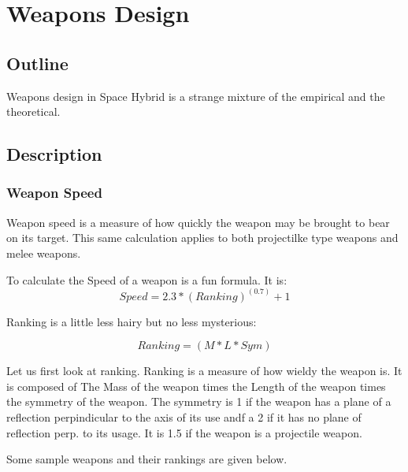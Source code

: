 
\chapter{Weapons Design}
\section{Outline}
Weapons design in Space Hybrid is a strange mixture of the empirical 
and the theoretical. 
\section{Description}

\subsection{Weapon Speed}

Weapon speed is a measure of how quickly the weapon may be brought 
to bear on its target. This same calculation applies to both 
projectilke type weapons and melee weapons.

To calculate the Speed of a weapon is a fun formula. It is:
\[Speed = 2.3*(Ranking)^{(0.7)}+1\]

Ranking is a little less hairy but no less mysterious:

\[Ranking = (M*L*Sym)\]

Let us first look at ranking. Ranking is a measure of how wieldy the 
weapon is. It is composed of The Mass of the weapon times the Length 
of the weapon times the symmetry of the weapon. The symmetry is 1 if 
the weapon has a plane of a reflection perpindicular to the axis of 
its use andf a 2 if it has no plane of reflection perp. to its usage.
It is 1.5 if the weapon is a projectile weapon.

Some sample weapons and their rankings are given below.

